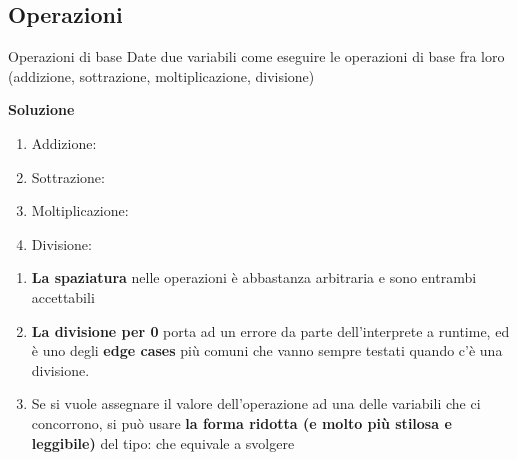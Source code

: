 \documentclass[10pt]{extarticle}
\makeatletter
\newcommand{\<}{\langle}
\renewcommand{\>}{\rangle}
\renewenvironment{proof}[1][\proofname] {\par\pushQED{\qed}
\renewcommand*{\proofname}{Soluzione}
{\normalfont\sffamily\bfseries\topsep6\p@\@plus6\p@\relax #1\@addpunct{.} }}{\popQED\endtrivlist\@endpefalse}
\theoremstyle{mystyle}{\newtheorem*{remark}{Nota}}
\theoremstyle{mystyle}{\newtheorem*{remarks}{Note}}
\theoremstyle{mystyle}{\newtheorem*{example}{Esempio}}
\theoremstyle{mystyle}{\newtheorem*{examples}{Esempi}}
\theoremstyle{definition}{\newtheorem*{exercise}{Exercise}}
\theoremstyle{warn}
\makeatother
\begin{document}
\subsection{Operazioni}
\begin{definition}{Operazioni di base}{}
Date due variabili  come eseguire le operazioni di base fra loro (addizione, sottrazione, moltiplicazione, divisione)
\end{definition}
\begin{proof}
\begin{enumerate}
    \item Addizione: 
    \item Sottrazione: 
    \item Moltiplicazione: 
    \item Divisione: 
\end{enumerate}
\end{proof}
\begin{remarks} \leavevmode
\begin{enumerate} 
    \item \textbf{La spaziatura} nelle operazioni è abbastanza arbitraria  e  sono entrambi accettabili
    \item \textbf{La divisione per 0} porta ad un errore da parte dell'interprete a runtime, ed è uno degli \textbf{edge cases} più comuni che vanno sempre testati quando c'è una divisione.
    \item Se si vuole assegnare il valore dell'operazione ad una delle variabili che ci concorrono, si può usare \textbf{la forma ridotta (e molto più stilosa e leggibile)} del tipo:  che equivale a svolgere 
\end{enumerate}
\end{remarks}
\end{document}
